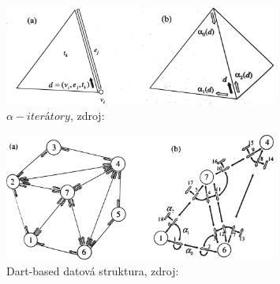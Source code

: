 \documentclass[12pt,a4paper]{article}
\begin{document}
{\begin{figure}[h!]
\centering
\includegraphics[width=0.8\textwidth]{img/iterators.png}
\caption{$\alpha-iterátory $, zdroj: \cite{triangulation}}
\label{fig:iterators}
\end{figure}

\newpage
\begin{figure}[h!]
\centering
\includegraphics[width=0.8\textwidth]{img/dart_struct.png}
\caption{Dart-based datová struktura, zdroj: \cite{triangulation}}
\label{fig:dart_struct}
\end{figure}

}
\end{document}
